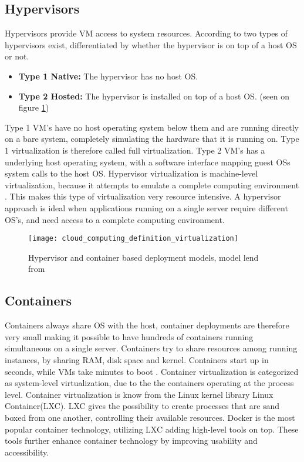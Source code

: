 \subsection{Hypervisors}
Hypervisors provide VM access to system resources. According to \cite[p.~100]{sosinsky2010cloud} two types of hypervisors exist, differentiated by whether the hypervisor is on top of a host OS or not.

\begin{itemize}
	\item \textbf{Type 1 Native:} The hypervisor has no host OS.
	\item \textbf{Type 2 Hosted:} The hypervisor is installed on top of a host OS. (seen on figure \ref{fig:cloud_computing_definition_virtualization})
\end{itemize}

Type 1 VM's have no host operating system below them and are running directly on a bare system, completely simulating the hardware that it is running on. Type 1 virtualization is therefore called full virtualization. Type 2 VM's has a underlying host operating system, with a software interface mapping guest OSs system calls to the host OS. Hypervisor virtualization is machine-level virtualization, because it attempts to emulate a complete computing environment \cite{fink2014docker}. This makes this type of virtualization very resource intensive. A hypervisor approach is ideal when applications running on a single server require different OS's, and need access to a complete computing environment.

\begin{figure}[!htb]
	\centering 
		 \texttt{[image: cloud\_computing\_definition\_virtualization]}  
	  \caption{Hypervisor and container based deployment models, model lend from \cite{bernstein2014containers}}
  \label{fig:cloud_computing_definition_virtualization}
\end{figure}

\subsection{Containers}
Containers always share OS with the host, container deployments are therefore very small making it possible to have hundreds of containers running simultaneous on a single server. Containers try to share resources among running instances, by sharing RAM, disk space and kernel. Containers start up in seconds, while VMs take minutes to boot \cite{dockerFAQ}. Container virtualization is categorized as system-level virtualization, due to the the containers operating at the process level. Container virtualization is know from the Linux kernel library Linux Container(LXC). LXC gives the possibility to create processes that are sand boxed from one another, controlling their available resources. Docker is the most popular container technology, utilizing LXC adding high-level tools on top. These tools further enhance container technology by improving usability and accessibility.

